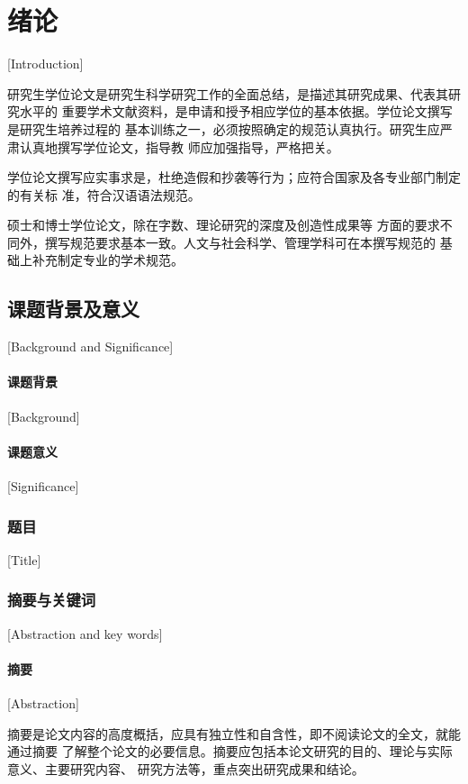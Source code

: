 
\chapter[绪论]{绪论}[Introduction]

研究生学位论文是研究生科学研究工作的全面总结，是描述其研究成果、代表其研究水平的
重要学术文献资料，是申请和授予相应学位的基本依据。学位论文撰写是研究生培养过程的
基本训练之一，必须按照确定的规范认真执行。研究生应严肃认真地撰写学位论文，指导教
师应加强指导，严格把关。

学位论文撰写应实事求是，杜绝造假和抄袭等行为；应符合国家及各专业部门制定的有关标
准，符合汉语语法规范。

硕士和博士学位论文，除在字数、理论研究的深度及创造性成果等
方面的要求不同外，撰写规范要求基本一致。人文与社会科学、管理学科可在本撰写规范的
基础上补充制定专业的学术规范。

\section{课题背景及意义}[Background and Significance]

\subsubsection{课题背景}[Background]

\subsubsection{课题意义}[Significance]


\subsection{题目}[Title]


\subsection{摘要与关键词}[Abstraction and key words]
\subsubsection{摘要}[Abstraction]

摘要是论文内容的高度概括，应具有独立性和自含性，即不阅读论文的全文，就能通过摘要
了解整个论文的必要信息。摘要应包括本论文研究的目的、理论与实际意义、主要研究内容、
研究方法等，重点突出研究成果和结论。

